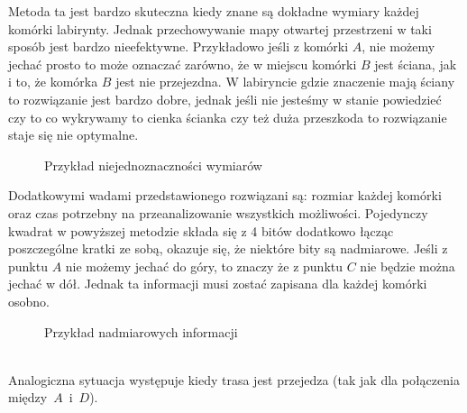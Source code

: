             Metoda ta jest bardzo skuteczna kiedy znane są dokładne wymiary każdej komórki labirynty.
            Jednak przechowywanie mapy otwartej przestrzeni w taki sposób jest bardzo nieefektywne.
            Przykładowo jeśli z komórki $A$, nie możemy jechać prosto to może oznaczać zarówno, że w miejscu komórki $B$ jest ściana, jak i to, że komórka $B$ jest nie przejezdna.
            W labiryncie gdzie znaczenie mają ściany to rozwiązanie jest bardzo dobre, jednak jeśli nie jesteśmy w stanie powiedzieć czy to co wykrywamy to cienka ścianka czy też duża przeszkoda to rozwiązanie staje się nie optymalne.

            \begin{figure}[!ht]
                \centering
                \caption{Przykład niejednoznaczności wymiarów}
            \end{figure}

            Dodatkowymi wadami przedstawionego rozwiązani są: rozmiar każdej komórki oraz czas potrzebny na przeanalizowanie wszystkich możliwości.
            Pojedynczy kwadrat w powyższej metodzie składa się z 4 bitów dodatkowo łącząc poszczególne kratki ze sobą, okazuje się, że niektóre bity są nadmiarowe.
            Jeśli z punktu $A$ nie możemy jechać do góry, to znaczy że z punktu $C$ nie będzie można jechać w dół.
            Jednak ta informacji musi zostać zapisana dla każdej komórki osobno.
            \begin{figure}[!ht]
                \centering
                \caption{Przykład nadmiarowych informacji}
            \end{figure}\\
            Analogiczna sytuacja występuje kiedy trasa jest przejedza (tak jak dla połączenia między~$A$~i~$D$).

